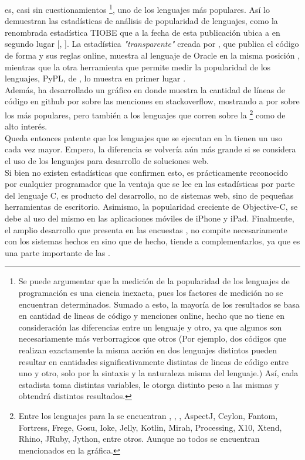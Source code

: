 \java es, casi sin cuestionamientos \footnote{
	Se puede argumentar que la medición de la popularidad de
	los lenguajes de programación es una ciencia inexacta, pues los factores de medición no
	se encuentran determinados. Sumado a esto, la mayoría de los resultados se basa en
	cantidad de lineas de código y menciones online, hecho que no tiene en consideración las
	diferencias entre un lenguaje y otro, ya que algunos son necesariamente más
	verborragicos que otros (Por ejemplo, dos códigos que realizan exactamente la misma
	acción en dos lenguajes distintos pueden resultar en cantidades significativamente
	distintas de lineas de código entre uno y otro, solo por la sintaxis y la naturaleza
	misma del lenguaje.) Así, cada estadista toma distintas variables, le otorga distinto
	peso a las mismas y obtendrá distintos resultados.
}, uno de los lenguajes más populares. Así lo demuestran las estadísticas de análisis de
popularidad de lenguajes, como la renombrada estadística TIOBE que a la fecha de esta
publicación ubica a \java en segundo lugar [,
\citeyear{TIOBE:2014:ONLINE}]. La estadística \emph{"transparente"} creada por
, que publica el código de forma \opensource y
sus reglas online, muestra al lenguaje de Oracle en la misma posición
, mientras que la otra herramienta \opensource que
permite medir la popularidad de los lenguajes, PyPL, de
, lo muestra en primer lugar
.\\
Además,  ha desarrollado un gráfico en donde muestra la
cantidad de líneas de código en \gls{github} por sobre las menciones en
\gls{stackoverflow}, mostrando a \java por sobre los más populares, pero también a los
lenguajes que corren sobre la \jvm\footnote{
	Entre los lenguajes para la \jvm se encuentran \scala, \clojure, \groovy, AspectJ,
	Ceylon, Fantom, Fortress, Frege, Gosu, Ioke, Jelly, Kotlin, Mirah, Processing, X10,
	Xtend, Rhino, JRuby, Jython, entre otros. Aunque no todos se encuentran mencionados
	en la gráfica.
} como de alto interés.\\
Queda entonces patente que los lenguajes que se ejecutan en la \jvm tienen un uso cada vez
mayor. Empero, la diferencia se volvería aún más grande si se considera el uso de los
lenguajes para desarrollo de soluciones web.\\
Si bien no existen estadísticas que confirmen esto, es prácticamente reconocido por
cualquier programador que la ventaja que se lee en las estadísticas por parte del lenguaje
C, es producto del desarrollo, no de sistemas web, sino de pequeñas herramientas de
escritorio. Asimismo, la popularidad creciente de Objective-C, se debe al uso del mismo en
las aplicaciones móviles de iPhone y iPad. Finalmente, el amplio desarrollo que presenta
en las encuestas \js, no compite necesariamente con los sistemas hechos en \jvm sino que
de hecho, tiende a complementarlos, ya que es una parte importante de las
\rias{}.\\



